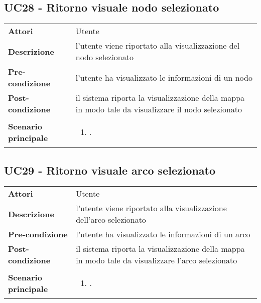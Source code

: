 \subsection{UC28 - Ritorno visuale nodo selezionato} 
\label{sssec:UC28} 
\def\arraystretch{1.5}
\begin{tabularx}{\textwidth}{l|p{}}
	\rowcolor{I} \multicolumn{2}{c}{\color{white}\textbf{UC28 - Ritorno visuale nodo selezionato}} \\
	\toprule
	\endhead
	\textbf{Attori} & Utente\\
	\textbf{Descrizione} & l'utente viene riportato alla visualizzazione del nodo selezionato\\
	\textbf{Pre-condizione} & l'utente ha visualizzato le informazioni di un nodo\\
	\textbf{Post-condizione} & il sistema riporta la visualizzazione della mappa in modo tale da visualizzare il nodo selezionato\\
	\textbf{Scenario principale} & \vspace{-1.2em}\begin{enumerate}[leftmargin=*,noitemsep,nosep]
		\item \nameref{sssec:UC28}.
	\end{enumerate}\\
	\bottomrule
\end{tabularx}
\subsection{UC29 - Ritorno visuale arco selezionato} 
\label{sssec:UC29} 
\def\arraystretch{1.5}
\begin{tabularx}{\textwidth}{l|p{}}
	\rowcolor{I} \multicolumn{2}{c}{\color{white}\textbf{UC29 - Ritorno visuale arco selezionato}} \\
	\toprule
	\endhead
	\textbf{Attori} & Utente\\
	\textbf{Descrizione} & l'utente viene riportato alla visualizzazione dell'arco selezionato\\
	\textbf{Pre-condizione} & l'utente ha visualizzato le informazioni di un arco\\
	\textbf{Post-condizione} & il sistema riporta la visualizzazione della mappa in modo tale da visualizzare l'arco selezionato\\
	\textbf{Scenario principale} & \vspace{-1.2em}\begin{enumerate}[leftmargin=*,noitemsep,nosep]
		\item \nameref{sssec:UC29}.
	\end{enumerate}\\
	\bottomrule
\end{tabularx}


